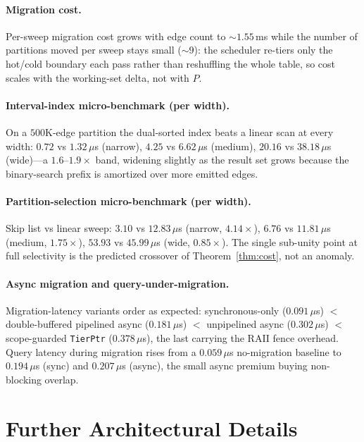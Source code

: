 \documentclass[10pt]{article}
\theoremstyle{definition}
\begin{document}
\paragraph{Migration cost.}
Per-sweep migration cost grows with edge count to ${\sim}1.55$\,ms while the number of
partitions moved per sweep stays small (${\sim}9$): the scheduler re-tiers only the
hot/cold boundary each pass rather than reshuffling the whole table, so cost scales
with the working-set delta, not with $P$.

\paragraph{Interval-index micro-benchmark (per width).}
On a $500$K-edge partition the dual-sorted index beats a linear scan at every width:
$0.72$ vs $1.32\,\mu$s (narrow), $4.25$ vs $6.62\,\mu$s (medium), $20.16$ vs
$38.18\,\mu$s (wide)---a $1.6$--$1.9\times$ band, widening slightly as the result set
grows because the binary-search prefix is amortized over more emitted edges.

\paragraph{Partition-selection micro-benchmark (per width).}
Skip list vs linear sweep: $3.10$ vs $12.83\,\mu$s (narrow, $4.14\times$), $6.76$ vs
$11.81\,\mu$s (medium, $1.75\times$), $53.93$ vs $45.99\,\mu$s (wide, $0.85\times$).
The single sub-unity point at full selectivity is the predicted crossover of
Theorem~\ref{thm:cost}, not an anomaly.

\paragraph{Async migration and query-under-migration.}
Migration-latency variants order as expected: synchronous-only ($0.091\,\mu$s) $<$
double-buffered pipelined async ($0.181\,\mu$s) $<$ unpipelined async ($0.302\,\mu$s)
$<$ scope-guarded \texttt{TierPtr} ($0.378\,\mu$s), the last carrying the RAII fence
overhead. Query latency during migration rises from a $0.059\,\mu$s no-migration
baseline to $0.194\,\mu$s (sync) and $0.207\,\mu$s (async), the small async premium
buying non-blocking overlap.

\section{Further Architectural Details}
\label{app:arch}
\end{document}
